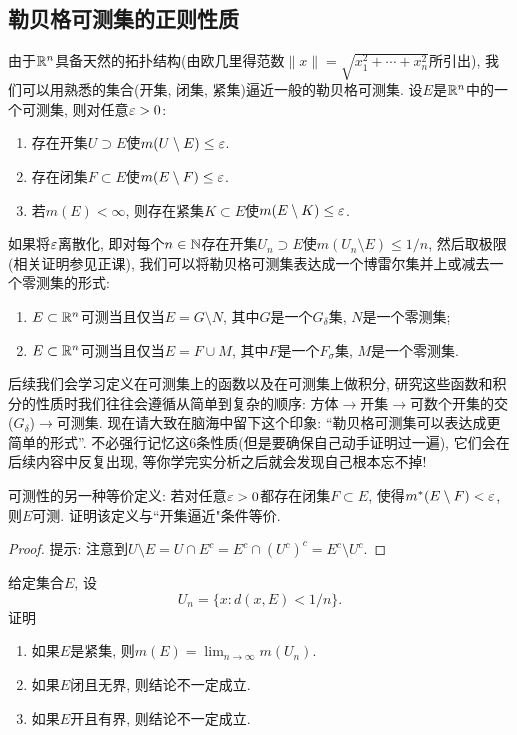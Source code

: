 \subsection{勒贝格可测集的正则性质}
由于$\mathbb{R}^n$具备天然的拓扑结构(由欧几里得范数$\|x\|=\sqrt{x_1^2 + \cdots + x_n^2}$所引出), 我们可以用熟悉的集合(开集, 闭集, 紧集)逼近一般的勒贝格可测集. 
设$E$是$\mathbb{R}^n$中的一个可测集, 则对任意$\varepsilon>0$:
\begin{enumerate}
    \item 存在开集$U \supset E$使$m(U \setminus E)\leq \varepsilon$.
    \item 存在闭集$F \subset E$使$m(E \setminus F)\leq \varepsilon$.
    \item 若$m(E)<\infty$, 则存在紧集$K\subset E$使$m(E \setminus K) \leq \varepsilon$. 
\end{enumerate}
如果将$\varepsilon$离散化, 即对每个$n \in \mathbb{N}$存在开集$U_n \supset E$使$m(U_n \setminus E) \leq 1/n$, 然后取极限(相关证明参见正课), 我们可以将勒贝格可测集表达成一个博雷尔集并上或减去一个零测集的形式:
\begin{enumerate}
    \item $E \subset \mathbb{R}^n$可测当且仅当$E=G \setminus N$, 其中$G$是一个$G_\delta$集, $N$是一个零测集;
    \item $E \subset \mathbb{R}^n$可测当且仅当$E=F \cup M$, 其中$F$是一个$F_\sigma$集, $M$是一个零测集. 
\end{enumerate}
后续我们会学习定义在可测集上的函数以及在可测集上做积分, 研究这些函数和积分的性质时我们往往会遵循从简单到复杂的顺序: 
方体$\rightarrow$开集$\rightarrow$可数个开集的交($G_\delta$)$\rightarrow$可测集. 现在请大致在脑海中留下这个印象: “勒贝格可测集可以表达成更简单的形式”. 不必强行记忆这6条性质(但是要确保自己动手证明过一遍), 它们会在后续内容中反复出现, 等你学完实分析之后就会发现自己根本忘不掉! 
\begin{exercise} %
    可测性的另一种等价定义: 若对任意$\varepsilon>0$都存在闭集$F \subset E$, 使得$m^*(E \setminus F) < \varepsilon$, 则$E$可测. 证明该定义与``开集逼近"条件等价.     
\end{exercise}
\begin{proof}
    提示: 注意到$U \setminus E = U \cap E^c = E^c \cap (U^c)^c = E^c \setminus U^c$.
\end{proof}
\begin{exercise}
    给定集合$E$, 设
    $$U_n = \{x: d(x,E)<1/n\}.$$ 证明
    \begin{enumerate}
    \item 如果$E$是紧集, 则$m(E)=\lim_{n\to \infty}m(U_n)$.
    \item 如果$E$闭且无界, 则结论不一定成立.
    \item 如果$E$开且有界, 则结论不一定成立.
    \end{enumerate}
\end{exercise}
